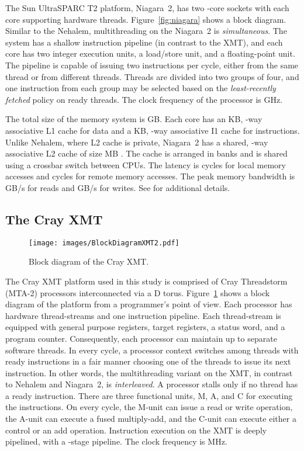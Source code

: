 \documentclass{article}
\begin{document}
The Sun UltraSPARC T2 platform, Niagara~2, has two -core sockets 
with each core supporting  hardware threads.  
Figure~\ref{fig:niagara} shows a block diagram. 
Similar to the Nehalem, multithreading on the Niagara~2  is {\em simultaneous}.
The system has a shallow instruction pipeline (in contrast to the XMT), and each core has
two integer execution units, a load/store unit, and a floating-point unit. The pipeline is capable of 
issuing two instructions per cycle, either from the same thread or from different threads.
Threads are divided into two groups of four, and one instruction from each group may be
selected based on the {\em least-recently fetched} policy on ready threads. 
The clock frequency of the processor  is  GHz.

The total size of the memory system is  GB.
Each core has an  KB, -way associative L1 cache for data
and a  KB, -way associative I1 cache for instructions. 
Unlike Nehalem, where L2 cache is private, Niagara~2 has a shared, -way
associative L2 cache of size  MB .
The cache is arranged in  banks and is shared using a crossbar switch between CPUs. 
The latency is  cycles for local memory accesses and  cycles for remote memory accesses. 
The peak memory bandwidth is  GB/s for reads and  GB/s for writes. 
See \cite{Shah-ASCC07} for additional details.

\subsection{The Cray XMT}
\label{sec:xmt}

\begin{figure}
\centering
\texttt{[image: images/BlockDiagramXMT2.pdf]}
\caption{Block diagram of the Cray XMT.}
\label{fig:xmt}
\end{figure}

The Cray XMT platform used in this study is comprised of  Cray Threadstorm (MTA-2) 
processors interconnected via a D torus.
Figure~\ref{fig:xmt} shows  a block diagram of the platform from a programmer's point of view.
Each processor has  hardware thread-streams and one instruction pipeline. 
Each thread-stream is equipped with  general purpose registers, 
 target registers, a status word, and a program counter.
Consequently, each processor can maintain up to  separate software threads.  
In every cycle, a processor context switches among threads with ready instructions in a 
fair manner choosing one of the threads to issue its next instruction.  
In other words, the multithreading variant on the XMT, in contrast to Nehalem and Niagara~2, 
is {\em interleaved}.
A processor stalls only if no thread has a ready instruction.
There are three functional  units, M, A, and C  for executing the instructions. 
On every cycle, the M-unit can issue a read or write operation, 
the A-unit can execute a fused multiply-add, and the C-unit can execute either a control or 
an add operation. Instruction execution on the XMT is deeply pipelined, with a -stage pipeline.
The clock frequency is  MHz.
\end{document}
